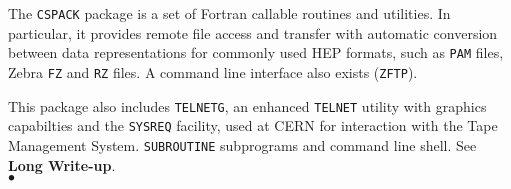                         
                         
                    
The {\tt CSPACK} package is a set of Fortran callable routines
and utilities.
In particular, it provides remote file access and transfer with
automatic conversion between data representations for commonly
used HEP formats, such as {\tt PAM} files, Zebra {\tt FZ} and
{\tt RZ} files. A command line interface also exists ({\tt ZFTP}).
\par
This package also includes {\tt TELNETG}, an enhanced {\tt TELNET}
utility with graphics capabilties and the {\tt SYSREQ} facility, used at
CERN for interaction with the Tape Management System.
\Structure
{\tt SUBROUTINE} subprograms and command line shell.
\Usage
See {\bf Long Write-up}.
\\ $\bullet$
